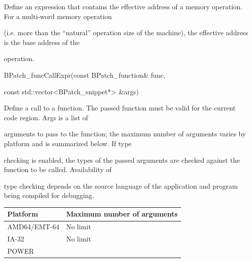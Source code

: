 {{{{{Define an expression that contains the effective address of a memory operation. For a multi-word memory operation

(i.e. more than the “natural” operation size of the machine), the effective address is the base address of the

operation.





\bigskip



{

BPatch_funcCallExpr(const BPatch_function& func,\newline

const std::vector<BPatch_snippet*> &args)}



{

Define a call to a function. The passed function must be valid for the current code region. Args is a list of

arguments to pass to the function; the maximum number of arguments varies by platform and is summarized below. If type

checking is enabled, the types of the passed arguments are checked against the function to be called. Availability of

type checking depends on the source language of the application and program being compiled for debugging.}



\begin{center}

\tablefirsthead{}

\tablehead{}

\tabletail{}

\tablelasttail{}

\begin{supertabular}{|m{1.0462599in}|m{2.94136in}|}

\hline

{ Platform} &

{ Maximum number of arguments}\\\hline

{ AMD64/EMT-64} &

{ No limit}\\\hline

{ IA-32} &

{ No limit}\\\hline

{ POWER} &


\end{supertabular}
\end{center}}}}}}
